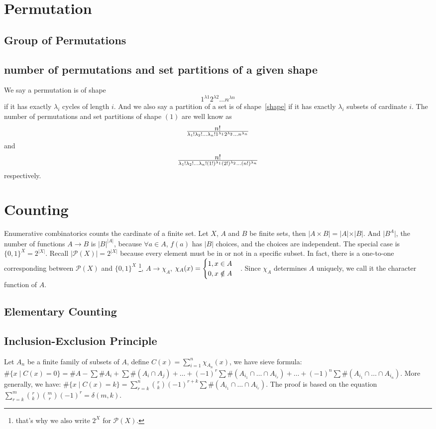 \section{Permutation}
\subsection{Group of Permutations}

\subsection{number of permutations and set partitions of a given shape}
We say a permutation is of shape
$$1^{\lambda 1}2^{\lambda 2} \dots n^{\lambda n} \label{shape}$$
if it has exactly $\lambda_i$ cycles of length $i$.
And we also say a partition of a set is of shape~\ref{shape}
if it has exactly $\lambda_i$ subsets of cardinate $i$.
The number of permutations and set partitions of shape $(1)$
are well know as
$$n! \over \lambda_1! \lambda_2! \dots \lambda_n!
		1^{\lambda_1} 2^{\lambda_2} \dots n^{\lambda_n}$$
and
$$n! \over \lambda_1! \lambda_2! \dots \lambda_n!
		(1!)^{\lambda_1} (2!)^{\lambda_2} \dots (n!)^{\lambda_n}$$
respectively.

\section{Counting}
Enumerative combinatorics counts the cardinate of a finite set.
Let $X$, $A$ and $B$ be finite sets, then $\vert A\times B\vert=\vert A\vert \times \vert B\vert$.
And $\vert B^{A}\vert$, the number of functions $A\to B$ is $\vert B\vert^{\vert A\vert}$,
because $\forall a\in A$, $f(a)$ has $\vert B\vert$ choices, and the choices are independent.
The special case is $\{0,1\}^{X}=2^{\vert X\vert}$. Recall $\vert \mathcal{P}(X)\vert=2^{\vert X\vert}$
because every element must be in or not in a specific subset.
In fact, there is a one-to-one corresponding between $\mathcal{P}(X)$ and $\{0,1\}^{X}$
\footnote{that's why we also write $2^{X}$ for $\mathcal{P}(X)$.},
$A \to \chi_A$, $\chi_A(x)=\begin{cases}1, x\in A\cr 0, x\notin A\end{cases}$.
Since $\chi_A$ determines $A$ uniquely, we call it the character function of $A$.

\subsection{Elementary Counting}
\subsection{Inclusion-Exclusion Principle}
Let $A_n$ be a finite family of subsets of $A$,
define $C(x)=\sum_{i=1}^{n}\chi_{A_n}(x)$,
we have sieve formula:
$\#\{x\mid C(x)=0\}=\#A - \sum\#A_i + \sum\#(A_i\cap A_j) + \dots
 + (-1)^r\sum\#(A_{i_1}\cap\dots\cap A_{i_r}) + \dots
 + (-1)^n\sum\#(A_{i_1}\cap\dots\cap A_{i_n})$.
More generally, we have:
$\#\{x\mid C(x)=k\}=\sum_{r=k}^{n}{r\choose k}(-1)^{r+k}\sum\#(A_{i_1}\cap \dots \cap A_{i_r})$.
The proof is based on the equation $\sum_{r=k}^{m}{r\choose k}{m\choose r}(-1)^r=\delta(m,k)$.


